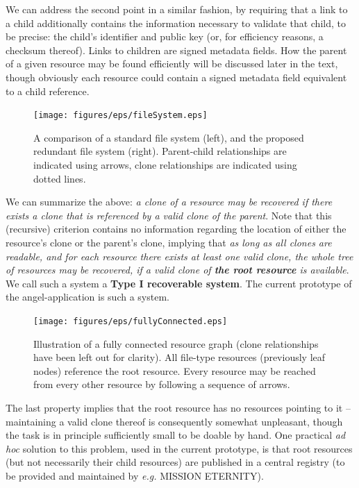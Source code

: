 \documentclass[11pt]{article}
\begin{document}
\begin{mainmatter}
We can address the second point in a similar fashion, by requiring that a link to a child additionally contains the information necessary to validate that child, to be precise: the child's identifier and public key (or, for efficiency reasons, a checksum thereof). Links to children are signed metadata fields. How the parent of a given resource may be found efficiently will be discussed later in the text, though obviously each resource could contain a signed metadata field equivalent to a child reference.

\begin{figure}[ht!]
\texttt{[image: figures/eps/fileSystem.eps]}
\caption{
A comparison of a standard file system (left), and the proposed redundant file system (right). Parent-child relationships are indicated using arrows, clone relationships are indicated using dotted lines.
}
\end{figure}

We can summarize the above: \emph{a clone of a resource may be recovered if there exists a clone that is referenced by a valid clone of the parent}. Note that this (recursive) criterion contains no information regarding the location of either the resource's clone or the parent's clone, implying that \emph{as long as all clones are readable, and for each resource there exists at least one valid clone, the whole tree of resources may be recovered, if a valid clone of \textbf{the root resource} is available}. We call such a system a\label{typeOne} \textbf{Type I recoverable system}. The current prototype of the angel-application is such a system.

\begin{figure}[ht!]
\texttt{[image: figures/eps/fullyConnected.eps]}
\caption{
Illustration of a fully connected resource graph (clone relationships have been left out for clarity). All file-type resources (previously leaf nodes) reference the root resource. Every resource may be reached from every other resource by following a sequence of arrows.
}
\end{figure}

 The last property implies that the root resource has no resources pointing to it -- maintaining a valid clone thereof is consequently somewhat unpleasant, though the task is in principle sufficiently small to be doable by hand. One practical \emph{ad hoc} solution to this problem, used in the current prototype, is that root resources (but not necessarily their child resources) are published in a central registry (to be provided and maintained by \emph{e.g.} MISSION ETERNITY). 


\end{mainmatter}
\end{document}
